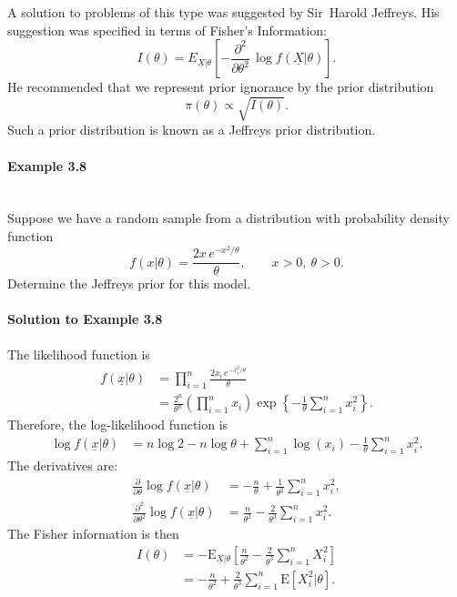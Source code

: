 A solution to problems of this type was suggested by Sir~Harold Jeffreys. His suggestion was specified in terms of Fisher's Information:
\begin{equation}
\label{eq:fisher}
I(\theta)=E_{\underline{X}|\theta}\left[-
\frac{\partial^2}{\partial\theta^{2}}\,
\log f(\underline{X}|\theta)\right].
\end{equation}
He recommended that we represent prior ignorance by the prior distribution
\begin{equation}
\pi(\theta)\propto \sqrt{I(\theta)}.
\end{equation}
Such a prior distribution is known as a Jeffreys prior distribution.

\paragraph{Example 3.8}{~\\
Suppose we have a random sample from a distribution with probability \label{ex:37} density function
\begin{equation*}
f(x|\theta)=\frac{2x\,e^{-x^2/\theta}}{\theta},\quad\quad x>0,~\theta>0.
\end{equation*}
Determine the Jeffreys prior for this model.

\paragraph{Solution to Example 3.8}{
    
        The likelihood function is
        \begin{align*}
        f(\underline{x}|\theta) 
        &=\prod_{i=1}^n \frac{2x_i\,e^{-x_i^2/\theta}}{\theta} \\
        &=\frac{2^n}{\theta^n}\left(\prod_{i=1}^n x_i\right)
        \exp\left\{-\frac{1}{\theta}\sum_{i=1}^n x_i^2\right\}.
        \end{align*}
        Therefore, the log-likelihood function is
        \begin{align*}
            \log f(\underline{x} | \theta) &= n\log 2 - n\log \theta + \sum_{i=1}^n\log(x_i) - \frac{1}{\theta}\sum_{i=1}^n x_i^2.
        \end{align*}
        The derivatives are:
        \begin{align*}
            \frac{\partial}{\partial \theta}\log f(\underline{x} | \theta) &= -\frac{n}{\theta} + \frac{1}{\theta^2}\sum_{i=1}^n x_i^2, \\
            \frac{\partial^2}{\partial \theta^2}\log f(\underline{x} | \theta) &= \frac{n}{\theta^2} - \frac{2}{\theta^3}\sum_{i=1}^n x_i^2.
        \end{align*}
        The Fisher information is then
        \begin{align*}
            I(\theta) &= -\text{E}_{\underline{X}|\theta}\left[ \frac{n}{\theta^2} - \frac{2}{\theta^3} \sum_{i=1}^n X_i^2  \right] \\
            &= -\frac{n}{\theta^2} + \frac{2}{\theta^3}\sum_{i=1}^n \text{E}[X_i^2|\theta].
        \end{align*}
    
}}
